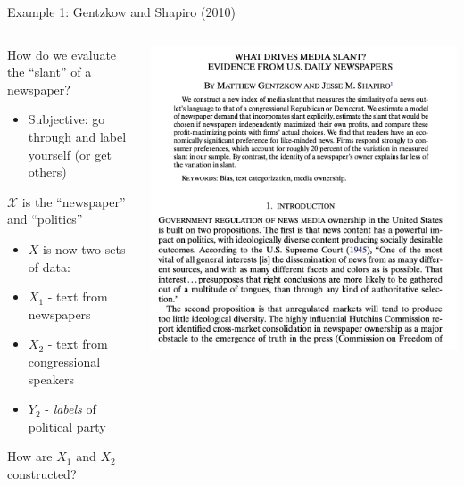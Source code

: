 \documentclass[notes,11pt, aspectratio=169]{beamer}
\newenvironment{wideitemize}{\itemize\addtolength{\itemsep}{10pt}}{\enditemize}
\begin{document}
\begin{frame}{Example 1: Gentzkow and Shapiro (2010)}
      \begin{columns}[onlytextwidth, T] %
      \begin{column}{.5\textwidth}
        \begin{wideitemize}
        \item How do we evaluate the ``slant'' of a newspaper?
          \begin{itemize}
          \item Subjective: go through and label yourself (or get others)
          \end{itemize}
        \item $\mathcal{X}$ is the ``newspaper'' and ``politics''
          \begin{itemize}
          \item $X$ is now two sets of data:
          \item $X_{1}$ - text from newspapers
          \item $X_{2}$ - text from congressional speakers
          \item $Y_{2}$ - \emph{labels} of political party
          \end{itemize}
        \item How are $X_{1}$ and $X_{2}$ constructed? 
        \end{wideitemize}
      \end{column}%
      \hfill%
      \begin{column}{.5\textwidth}
        \includegraphics[width=\linewidth]{images/gentzkowshapiro_1.png}
      \end{column}%
    \end{columns}
\end{frame}
\end{document}
